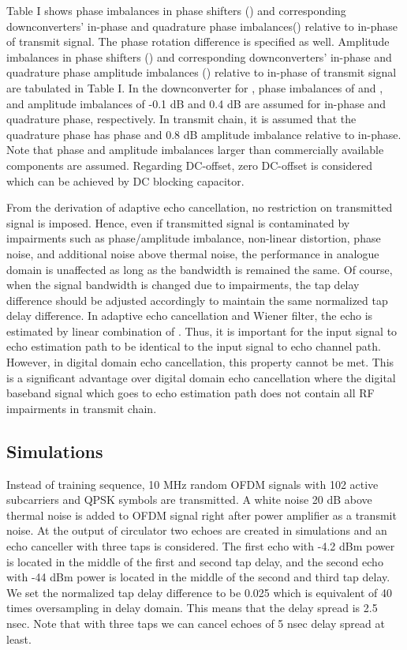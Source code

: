 \documentclass[twocolumn]{IEEEtran}
\begin{document}
Table I shows phase imbalances in phase shifters () and
corresponding downconverters' in-phase and quadrature phase
imbalances() relative to in-phase of
transmit signal. The phase rotation difference  is
specified as well. Amplitude imbalances in phase shifters
() and corresponding downconverters' in-phase and
quadrature phase amplitude imbalances ()
relative to in-phase of transmit signal are tabulated in Table I. In
the downconverter for , phase imbalances of  and
, and amplitude imbalances of -0.1 dB and 0.4 dB are
assumed for in-phase and quadrature phase, respectively. In transmit
chain, it is assumed that the quadrature phase has  phase
and 0.8 dB amplitude imbalance relative to in-phase. Note that phase
and amplitude imbalances larger than commercially available
components are assumed. Regarding DC-offset, zero DC-offset is
considered which can be achieved by DC blocking capacitor.

From the derivation of adaptive echo cancellation, no restriction on
transmitted signal is imposed. Hence, even if transmitted signal
 is contaminated by impairments such as phase/amplitude
imbalance, non-linear distortion, phase noise, and additional noise
above thermal noise, the performance in analogue domain is
unaffected as long as the bandwidth is remained the same. Of course,
when the signal bandwidth is changed due to impairments, the tap
delay difference  should be adjusted
accordingly to maintain the same normalized tap delay difference. In
adaptive echo cancellation and Wiener filter, the echo 
is estimated by linear combination of . Thus, it is
important for the input signal to echo estimation path to be
identical to the input signal to echo channel path. However, in
digital domain echo cancellation, this property cannot be met. This
is a significant advantage over digital domain echo cancellation
where the digital baseband signal which goes to echo estimation path
does not contain all RF impairments in transmit chain.


\subsection{Simulations}

Instead of training sequence, 10 MHz random OFDM signals with 102
active subcarriers and QPSK symbols are transmitted. A white noise
20 dB above thermal noise is added to OFDM signal right after power
amplifier as a transmit noise. At the output of circulator two
echoes are created in simulations and an echo canceller with three
taps is considered. The first echo with -4.2 dBm power is located in
the middle of the first and second tap delay, and the second echo
with -44 dBm power is located in the middle of the second and third
tap delay. We set the normalized tap delay difference  to be 0.025 which is equivalent of 40 times
oversampling in delay domain. This means that the delay spread is
2.5 nsec. Note that with three taps we can cancel echoes of 5 nsec
delay spread at least.
\end{document}

